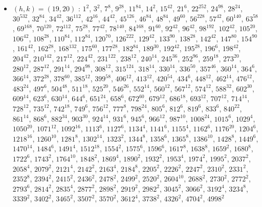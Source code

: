 \begin{itemize}
\item $(h,k)=(19,20)$ : $1^{2}$, $3^{2}$, $7^{8}$, $9^{28}$, $11^{84}$, $14^{2}$, $15^{42}$, $21^{6}$, $22^{252}$, $24^{98}$, $28^{24}$, $30^{532}$, $32^{84}$, $34^{42}$, $36^{112}$, $42^{16}$, $44^{42}$, $45^{126}$, $46^{84}$, $48^{84}$, $49^{60}$, $56^{228}$, $57^{42}$, $60^{140}$, $63^{58}$, $69^{168}$, $70^{120}$, $72^{112}$, $75^{28}$, $77^{42}$, $78^{140}$, $84^{168}$, $91^{60}$, $92^{42}$, $96^{42}$, $98^{192}$, $102^{42}$, $105^{20}$, $106^{42}$, $108^{28}$, $110^{84}$, $112^{84}$, $120^{70}$, $126^{222}$, $129^{42}$, $133^{90}$, $138^{28}$, $142^{42}$, $147^{80}$, $154^{90}$, $161^{42}$, $162^{28}$, $168^{132}$, $175^{60}$, $177^{28}$, $182^{84}$, $189^{30}$, $192^{42}$, $195^{28}$, $196^{6}$, $198^{42}$, $204^{42}$, $210^{142}$, $217^{12}$, $224^{42}$, $231^{122}$, $238^{12}$, $240^{14}$, $245^{36}$, $252^{96}$, $259^{18}$, $273^{20}$, $280^{12}$, $287^{12}$, $291^{14}$, $294^{98}$, $308^{12}$, $315^{124}$, $318^{14}$, $330^{14}$, $336^{50}$, $357^{46}$, $360^{14}$, $364^{6}$, $366^{14}$, $372^{28}$, $378^{60}$, $385^{12}$, $399^{58}$, $406^{12}$, $413^{12}$, $420^{54}$, $434^{6}$, $448^{12}$, $462^{14}$, $476^{12}$, $483^{24}$, $497^{6}$, $504^{48}$, $511^{18}$, $525^{20}$, $546^{26}$, $552^{14}$, $560^{12}$, $567^{12}$, $574^{12}$, $588^{32}$, $602^{30}$, $609^{14}$, $623^{6}$, $630^{14}$, $644^{6}$, $651^{24}$, $658^{6}$, $672^{60}$, $679^{12}$, $686^{18}$, $693^{12}$, $707^{12}$, $714^{14}$, $728^{12}$, $735^{12}$, $742^{18}$, $749^{6}$, $756^{12}$, $777^{8}$, $798^{24}$, $805^{6}$, $812^{6}$, $819^{6}$, $833^{6}$, $840^{22}$, $861^{14}$, $868^{6}$, $882^{34}$, $903^{30}$, $924^{14}$, $931^{6}$, $945^{6}$, $966^{12}$, $987^{10}$, $1008^{24}$, $1015^{6}$, $1029^{4}$, $1050^{20}$, $1071^{12}$, $1092^{16}$, $1113^{6}$, $1127^{6}$, $1134^{4}$, $1141^{6}$, $1155^{4}$, $1162^{6}$, $1176^{20}$, $1204^{6}$, $1218^{16}$, $1260^{10}$, $1281^{8}$, $1302^{14}$, $1323^{2}$, $1344^{8}$, $1358^{6}$, $1365^{8}$, $1386^{10}$, $1428^{8}$, $1449^{6}$, $1470^{14}$, $1484^{6}$, $1491^{4}$, $1512^{18}$, $1554^{2}$, $1575^{6}$, $1596^{6}$, $1617^{8}$, $1638^{8}$, $1659^{2}$, $1680^{8}$, $1722^{6}$, $1743^{2}$, $1764^{10}$, $1848^{2}$, $1869^{4}$, $1890^{2}$, $1932^{2}$, $1953^{4}$, $1974^{2}$, $1995^{2}$, $2037^{2}$, $2058^{4}$, $2079^{2}$, $2121^{4}$, $2142^{2}$, $2163^{4}$, $2184^{8}$, $2205^{2}$, $2226^{2}$, $2247^{2}$, $2310^{2}$, $2331^{2}$, $2352^{8}$, $2394^{2}$, $2415^{2}$, $2436^{2}$, $2478^{2}$, $2499^{2}$, $2520^{2}$, $2604^{10}$, $2688^{2}$, $2730^{2}$, $2772^{2}$, $2793^{6}$, $2814^{2}$, $2835^{4}$, $2877^{2}$, $2898^{2}$, $2919^{2}$, $2982^{2}$, $3045^{2}$, $3066^{2}$, $3192^{4}$, $3234^{8}$, $3339^{2}$, $3402^{2}$, $3465^{2}$, $3507^{2}$, $3570^{2}$, $3612^{4}$, $3738^{2}$, $4326^{2}$, $4704^{2}$, $4998^{2}$
\end{itemize}
